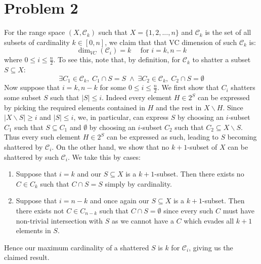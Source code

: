 \documentclass[12pt]{article}%
\begin{document}
\section*{Problem 2}
For the range space $(X,\mathcal{C}_k)$ such that $X = \{1,2,...,n\}$ and $\mathcal{C}_k$ is the set of all subsets of cardinality $k \in [0,n]$, we claim that that VC dimension of such $\mathcal{C}_k$ is:
$$ \dim_{VC}(\mathcal{C}_i) = k \quad \text{ for } i = k, n-k $$ where
$0 \leq i \leq \frac{n}{2}$. To see this, note that, by definition, for $\mathcal{C}_k$ to shatter a subset $S \subseteq X$:
$$ \exists C_1 \in \mathcal{C}_k, \; C_1 \cap S = S \; \wedge \; \exists C_2 \in \mathcal{C}_k, \; C_2 \cap S = \emptyset $$
Now suppose that $i = k, n-k$ for some $0 \leq i \leq \frac{n}{2}$.
We first show that $C_i$ shatters some subset $S$ such that $|S| \leq i$. Indeed every element $H \in 2^S$ can be expressed by picking the required elements contained in $H$ and the rest in $X\backslash H$. \newline \newline
Since $|X \backslash S| \geq i$ and $|S| \leq i$, we, in particular, can express $S$ by choosing an $i$-subset $C_1$ such that $S \subseteq C_1$ and $\emptyset$ by choosing an $i$-subset $C_2$ such that $C_2 \subseteq X \backslash S$. \newline \newline
Thus every such element $H \in 2^S$ can be expressed as such, leading to $S$ becoming shattered by $\mathcal{C}_i$. On the other hand, we show that no $k+1$-subset of $X$ can be shattered by such $\mathcal{C}_i$. We take this by cases:
\begin{enumerate}
  \item Suppose that $i = k$ and our $S \subseteq X$ is a $k+1$-subset. Then there exists no $C \in C_{k}$ such that $C \cap S = S$ simply by cardinality.
  \item Suppose that $i = n-k$ and once again our $S \subseteq X$ is a $k+1$-subset. Then there exists not $C \in C_{n-k}$ such that $C \cap S = \emptyset$ since every such $C$ must have non-trivial intersection with $S$ as we cannot have a $C$ which evades all $k+1$ elements in $S$.
\end{enumerate}
Hence our maximum cardinality of a shattered $S$ is $k$ for $\mathcal{C}_i$, giving us the claimed result.
\end{document}
